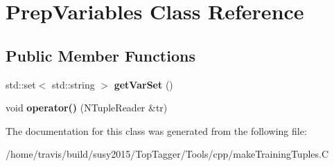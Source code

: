 \hypertarget{classPrepVariables}{\section{Prep\-Variables Class Reference}
\label{classPrepVariables}
}
\subsection*{Public Member Functions}
\begin{DoxyCompactItemize}
\item 
\hypertarget{classPrepVariables_a347b319c24242ecda7f705b96ca29199}{std\-::set$<$ std\-::string $>$ {\bfseries get\-Var\-Set} ()}\label{classPrepVariables_a347b319c24242ecda7f705b96ca29199}

\item 
\hypertarget{classPrepVariables_aed38f9b1b9087c13d9380b04ab6c598e}{void {\bfseries operator()} (N\-Tuple\-Reader \&tr)}\label{classPrepVariables_aed38f9b1b9087c13d9380b04ab6c598e}

\end{DoxyCompactItemize}


The documentation for this class was generated from the following file\-:\begin{DoxyCompactItemize}
\item 
/home/travis/build/susy2015/\-Top\-Tagger/\-Tools/cpp/make\-Training\-Tuples.\-C\end{DoxyCompactItemize}
